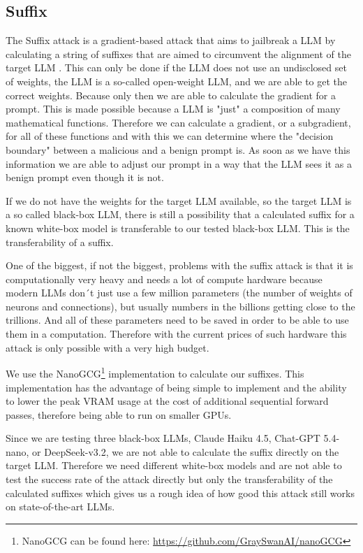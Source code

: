 \documentclass[11pt,a4paper,twocolumn]{article}
\begin{document}
	\subsection{Suffix}
	
	The Suffix attack is a gradient-based attack that aims to jailbreak a LLM by calculating a string of suffixes that are aimed to circumvent the alignment of the target LLM \cite{zou2023universaltransferableadversarialattacks}.
	This can only be done if the LLM does not use an undisclosed set of weights, the LLM is a so-called open-weight LLM, and we are able to get the correct weights.
	Because only then we are able to calculate the gradient for a prompt.
	This is made possible because a LLM is "just" a composition of many mathematical functions.
	Therefore we can calculate a gradient, or a subgradient, for all of these functions and with this we can determine where the "decision boundary" between a malicious and a benign prompt is.
	As soon as we have this information we are able to adjust our prompt in a way that the LLM sees it as a benign prompt even though it is not.
	
	If we do not have the weights for the target LLM available, so the target LLM is a so called black-box LLM, there is still a possibility that a calculated suffix for a known white-box model is transferable to our tested black-box LLM.
	This is the transferability of a suffix.
	
	One of the biggest, if not the biggest, problems with the suffix attack is that it is computationally very heavy and needs a lot of compute hardware because modern LLMs don´t just use a few million parameters (the number of weights of neurons and connections), but usually numbers in the billions getting close to the trillions.
	And all of these parameters need to be saved in order to be able to use them in a computation.
	Therefore with the current prices of such hardware this attack is only possible with a very high budget.
	
	We use the NanoGCG\footnote{NanoGCG can be found here: \url{https://github.com/GraySwanAI/nanoGCG}} implementation to calculate our suffixes.
	This implementation has the advantage of being simple to implement and the ability to lower the peak VRAM usage at the cost of additional sequential forward passes, therefore being able to run on smaller GPUs.
	
	Since we are testing three black-box LLMs, Claude Haiku 4.5, Chat-GPT 5.4-nano, or DeepSeek-v3.2, we are not able to calculate the suffix directly on the target LLM.
	Therefore we need different white-box models and are not able to test the success rate of the attack directly but only the transferability of the calculated suffixes which gives us a rough idea of how good this attack still works on state-of-the-art LLMs.
	
\end{document}
